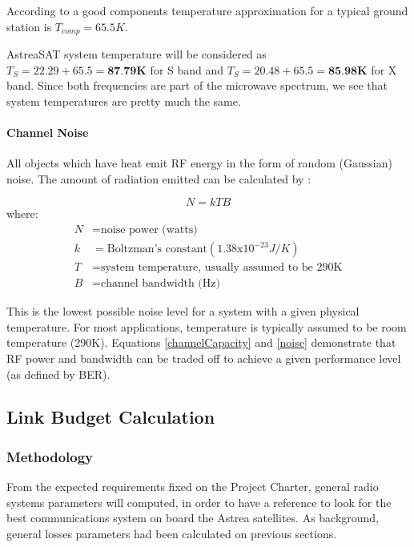 According to \cite{Jorge2012} a good components temperature approximation for a typical ground station is $T_{comp}=65.5K$.

AstreaSAT system temperature will be considered as $T_S=22.29+65.5=\textbf{87.79K}$ for S band and $T_S=20.48+65.5=\textbf{85.98K}$ for X band. Since both frequencies are part of the microwave spectrum, we see that system temperatures are pretty much the same.

\paragraph{Channel Noise}
All objects which have heat emit RF energy in the form of random (Gaussian) noise. The amount of radiation emitted can be calculated by \cite{Note1998}:

\begin{equation}
N=kTB
\label{noise}
\end{equation}
where:
\begin{align*}
	N&= \text{noise power (watts)}\\
	k&= \text{Boltzman's constant}(1.38\mathrm{x}10^{-23}J/K)\\
	T&= \text{system temperature, usually assumed to be 290K}\\
	B&= \text{channel bandwidth (Hz)}
\end{align*}

This is the lowest possible noise level for a system with a given physical temperature. For most applications, temperature is typically assumed to be room temperature (290K). Equations \ref{channelCapacity} and \ref{noise} demonstrate that RF power and bandwidth can be traded off to achieve a given performance level (as defined by BER). \cite{Note1998}

\subsection{Link Budget Calculation}

\subsubsection{Methodology}
From the expected requirements fixed on the Project Charter, general radio systems parameters will computed, in order to have a reference to look for the best communications system on board the Astrea satellites. As background, general losses parameters had been calculated on previous sections. 

